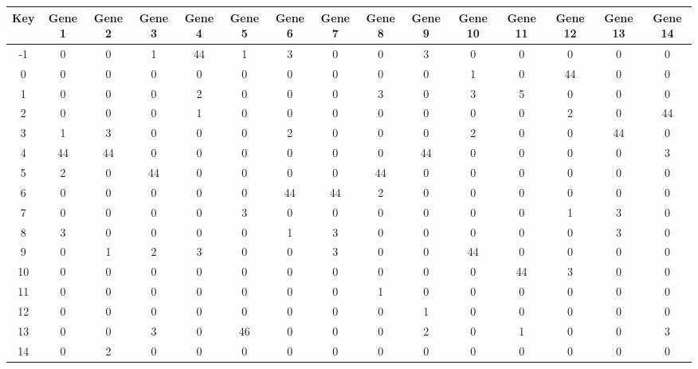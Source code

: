 \begin{tabular}{|c|c|c|c|c|c|c|c|c|c|c|c|c|c|c|}
\hline
Key & Gene 1 & Gene 2 & Gene 3 & Gene 4 & Gene 5 & Gene 6 & Gene 7 & Gene 8 & Gene 9 & Gene 10 & Gene 11 & Gene 12 & Gene 13 & Gene 14 \\
\hline
-1 & 0 & 0 & 1 & 44 & 1 & 3 & 0 & 0 & 3 & 0 & 0 & 0 & 0 & 0 \\
0 & 0 & 0 & 0 & 0 & 0 & 0 & 0 & 0 & 0 & 1 & 0 & 44 & 0 & 0 \\
1 & 0 & 0 & 0 & 2 & 0 & 0 & 0 & 3 & 0 & 3 & 5 & 0 & 0 & 0 \\
2 & 0 & 0 & 0 & 1 & 0 & 0 & 0 & 0 & 0 & 0 & 0 & 2 & 0 & 44 \\
3 & 1 & 3 & 0 & 0 & 0 & 2 & 0 & 0 & 0 & 2 & 0 & 0 & 44 & 0 \\
4 & 44 & 44 & 0 & 0 & 0 & 0 & 0 & 0 & 44 & 0 & 0 & 0 & 0 & 3 \\
5 & 2 & 0 & 44 & 0 & 0 & 0 & 0 & 44 & 0 & 0 & 0 & 0 & 0 & 0 \\
6 & 0 & 0 & 0 & 0 & 0 & 44 & 44 & 2 & 0 & 0 & 0 & 0 & 0 & 0 \\
7 & 0 & 0 & 0 & 0 & 3 & 0 & 0 & 0 & 0 & 0 & 0 & 1 & 3 & 0 \\
8 & 3 & 0 & 0 & 0 & 0 & 1 & 3 & 0 & 0 & 0 & 0 & 0 & 3 & 0 \\
9 & 0 & 1 & 2 & 3 & 0 & 0 & 3 & 0 & 0 & 44 & 0 & 0 & 0 & 0 \\
10 & 0 & 0 & 0 & 0 & 0 & 0 & 0 & 0 & 0 & 0 & 44 & 3 & 0 & 0 \\
11 & 0 & 0 & 0 & 0 & 0 & 0 & 0 & 1 & 0 & 0 & 0 & 0 & 0 & 0 \\
12 & 0 & 0 & 0 & 0 & 0 & 0 & 0 & 0 & 1 & 0 & 0 & 0 & 0 & 0 \\
13 & 0 & 0 & 3 & 0 & 46 & 0 & 0 & 0 & 2 & 0 & 1 & 0 & 0 & 3 \\
14 & 0 & 2 & 0 & 0 & 0 & 0 & 0 & 0 & 0 & 0 & 0 & 0 & 0 & 0 \\
\hline
\end{tabular}